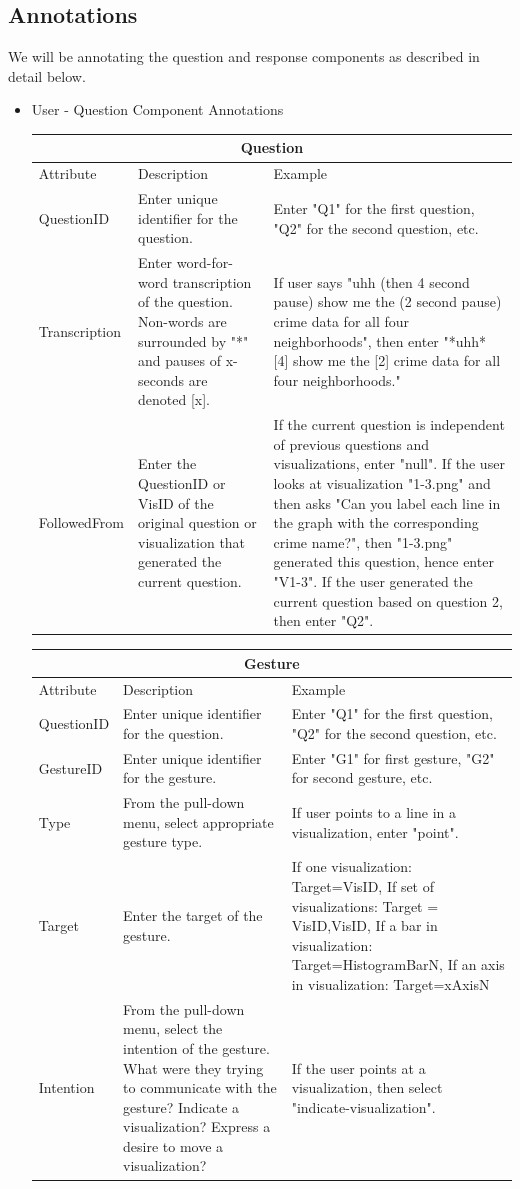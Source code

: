 \documentclass[]{article}
\begin{document}
\subsection{Annotations}
We will be annotating the question and response components as described in detail below.
\begin{itemize}

\item User - Question Component Annotations \\

\begin{tabular}{ |p{4cm}|p{5cm}|p{5cm}|  }
\hline
\multicolumn{3}{|c|}{Question} \\
\hline
Attribute& Description & Example \\
\hline
QuestionID & Enter unique identifier for the question. & Enter "Q1" for the first question, "Q2" for the second question, etc. \\
Transcription & Enter word-for-word transcription of the question. Non-words are surrounded by "*" and pauses of x-seconds are denoted [x]. & If user says "uhh (then 4 second pause) show me the (2 second pause) crime data for all four neighborhoods", then enter "*uhh* [4] show me the [2] crime data for all four neighborhoods." \\
FollowedFrom & Enter the QuestionID or VisID of the original question or visualization that generated the current question. & If the current question is independent of previous questions and visualizations, enter "null". If the user looks at visualization "1-3.png" and then asks "Can you label each line in the graph with the corresponding crime name?", then "1-3.png" generated this question, hence enter "V1-3". If the user generated the current question based on question 2, then enter "Q2". \\
\hline
\end{tabular}


\begin{tabular}{ |p{4cm}|p{5cm}|p{5cm}|  }
\hline
\multicolumn{3}{|c|}{Gesture} \\
\hline
Attribute & Description & Example \\
\hline
QuestionID & Enter unique identifier for the question. & Enter "Q1" for the first question, "Q2" for the second question, etc. \\
GestureID & Enter unique identifier for the gesture. & Enter "G1" for first gesture, "G2" for second gesture, etc. \\
Type & From the pull-down menu, select appropriate gesture type. & If user points to a line in a visualization, enter "point". \\
Target & Enter the target of the gesture. &
If one visualization: Target=VisID, 
If set of visualizations: Target = VisID,VisID, 
If a bar in visualization: Target=HistogramBarN, 
If an axis in visualization: Target=xAxisN \\
Intention & From the pull-down menu, select the intention of the gesture. What were they trying to communicate with the gesture? Indicate a visualization? Express a desire to move a visualization? & If the user points at a visualization, then select "indicate-visualization". \\


\end{tabular}
\end{itemize}
\end{document}
